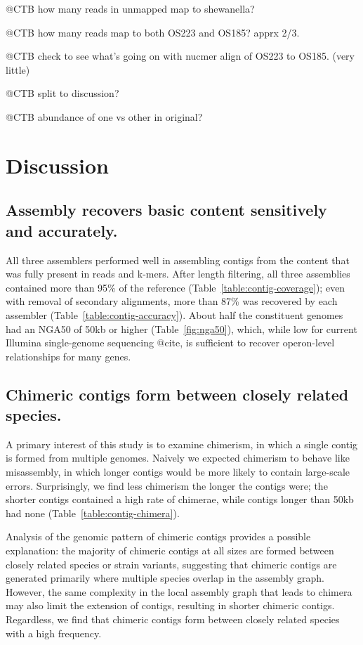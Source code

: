 \documentclass[10pt,a4paper,twocolumn]{article}
\begin{document}
@CTB how many reads in unmapped map to shewanella?

@CTB how many reads map to both OS223 and OS185? apprx 2/3.

@CTB check to see what's going on with nucmer align of OS223 to OS185. (very little)

@CTB split to discussion?

@CTB abundance of one vs other in original?

\section*{Discussion}

\subsection*{Assembly recovers basic content sensitively and accurately.}

All three assemblers performed well in assembling contigs from the
content that was fully present in reads and k-mers.  After length filtering,
all three assemblies contained more than 95\% of the reference
(Table~\ref{table:contig-coverage}); even with removal of secondary
alignments, more than 87\% was recovered by each assembler
(Table~\ref{table:contig-accuracy}). About half the constituent genomes had
an NGA50 of 50kb or higher (Table~\ref{fig:nga50}),
which, while low for current Illumina single-genome sequencing @cite,
is sufficient to recover operon-level relationships for many genes.


\subsection*{Chimeric contigs form between closely related species.}

A primary interest of this study is to examine chimerism, in which a
single contig is formed from multiple genomes.  Naively we expected
chimerism to behave like misassembly, in which longer contigs would be
more likely to contain large-scale errors.  Surprisingly, we find
less chimerism the longer the contigs were; the shorter contigs
contained a high rate of chimerae, while contigs longer than 50kb had
none (Table~\ref{table:contig-chimera}).

Analysis of the genomic pattern of chimeric contigs provides a possible
explanation: the majority of chimeric contigs at all sizes are formed
between closely related species or strain variants, suggesting that
chimeric contigs are generated primarily where multiple species
overlap in the assembly graph.  However, the same complexity in the
local assembly graph that leads to chimera may also limit the
extension of contigs, resulting in shorter chimeric contigs.
Regardless, we find that chimeric contigs form between closely
related species with a high frequency.
\end{document}
